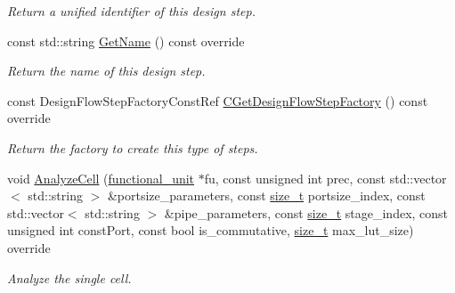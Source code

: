 \begin{DoxyCompactItemize}
\begin{DoxyCompactList}\small\item\em Return a unified identifier of this design step. \end{DoxyCompactList}\item 
const std\+::string \hyperlink{classGenerateFuList_a0b6efa299b9de2bc45157d9e28a97a9e}{Get\+Name} () const override
\begin{DoxyCompactList}\small\item\em Return the name of this design step. \end{DoxyCompactList}\item 
const Design\+Flow\+Step\+Factory\+Const\+Ref \hyperlink{classGenerateFuList_a51c1a9b6fe9a61328d6dc99d8e0bd47c}{C\+Get\+Design\+Flow\+Step\+Factory} () const override
\begin{DoxyCompactList}\small\item\em Return the factory to create this type of steps. \end{DoxyCompactList}\item 
void \hyperlink{classGenerateFuList_a133ca515874d6d494d54dae031046a25}{Analyze\+Cell} (\hyperlink{structfunctional__unit}{functional\+\_\+unit} $\ast$fu, const unsigned int prec, const std\+::vector$<$ std\+::string $>$ \&portsize\+\_\+parameters, const \hyperlink{tutorial__fpt__2017_2intro_2sixth_2test_8c_a7c94ea6f8948649f8d181ae55911eeaf}{size\+\_\+t} portsize\+\_\+index, const std\+::vector$<$ std\+::string $>$ \&pipe\+\_\+parameters, const \hyperlink{tutorial__fpt__2017_2intro_2sixth_2test_8c_a7c94ea6f8948649f8d181ae55911eeaf}{size\+\_\+t} stage\+\_\+index, const unsigned int const\+Port, const bool is\+\_\+commutative, \hyperlink{tutorial__fpt__2017_2intro_2sixth_2test_8c_a7c94ea6f8948649f8d181ae55911eeaf}{size\+\_\+t} max\+\_\+lut\+\_\+size) override
\begin{DoxyCompactList}\small\item\em Analyze the single cell. \end{DoxyCompactList}\end{DoxyCompactItemize}
